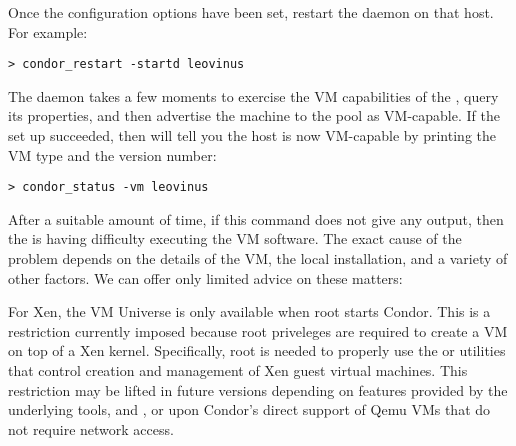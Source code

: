 Once the configuration options have been set, restart the  
daemon on that host.  For example:

\begin{verbatim}
> condor_restart -startd leovinus
\end{verbatim}

The  daemon takes a few moments to exercise the VM
capabilities of the , query its properties, and then 
advertise the machine to the pool as VM-capable.  If the set up 
succeeded, then  will tell you the host is now 
VM-capable by printing the VM type and the version number:

\begin{verbatim}
> condor_status -vm leovinus
\end{verbatim}

After a suitable amount of time, if this command does not give any output,
then the  is having difficulty executing the VM software.
The exact cause of the problem depends on the details of the VM, the local 
installation, and a variety of other factors. We can offer only limited 
advice on these matters:

For Xen, the VM Universe is only available when root starts Condor.
This is a restriction currently imposed because root priveleges are 
required to create a VM on top of a Xen kernel. Specifically, root is needed 
to properly use the  or  utilities that control 
creation and management of Xen guest virtual machines. This restriction 
may be lifted in future versions depending on features provided by the 
underlying tools,  and , or upon Condor's direct 
support of Qemu VMs that do not require network access.
